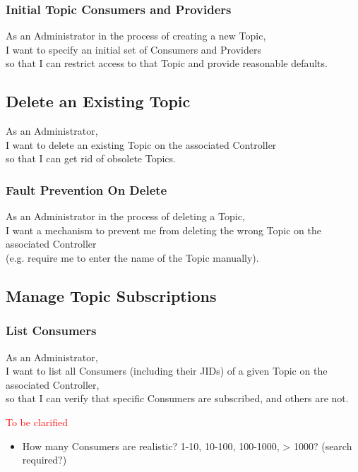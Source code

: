 \subsubsection{Initial Topic Consumers and Providers}

As an Administrator in the process of creating a new Topic,\\
I want to specify an initial set of Consumers and Providers \\
so that I can restrict access to that Topic and provide reasonable defaults.

\subsection{Delete an Existing Topic}

As an Administrator,\\
I want to delete an existing Topic on the associated Controller\\
so that I can get rid of obsolete Topics.

\subsubsection{Fault Prevention On Delete}

As an Administrator in the process of deleting a Topic, \\
I want a mechanism to prevent me from deleting the wrong Topic on the associated Controller\\
(e.g. require me to enter the name of the Topic manually).

\subsection{Manage Topic Subscriptions}

\subsubsection{List Consumers}

As an Administrator, \\
I want to list all Consumers (including their JIDs) of a given Topic on the associated Controller, \\
so that I can verify that specific Consumers are subscribed, and others are not.

\noindent\textcolor{red}{To be clarified}

\begin{itemize}
    \item How many Consumers are realistic? 1-10, 10-100, 100-1000, > 1000? (search required?)
\end{itemize}


